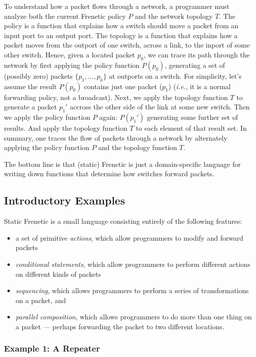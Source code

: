 \documentclass{article}
\newcommand{\ie}{\emph{i.e.}}
\begin{document}
To understand how a packet flows through a network, a programmer must
analyze both the current Frenetic policy $P$ and the network topology
$T$.  The policy is a function that explains how a switch should move
a packet from an input port to an output port.  The topology is a
function that explains how a packet moves from the outport of one
switch, across a link, to the inport of some other switch.  Hence,
given a located packet $p_0$, we can trace its path through the
network by first applying the policy function $P(p_0)$, generating a
set of (possibly zero) packets $\{p_1,\ldots,p_k\}$ at outports on a
switch.  For simplicity, let's assume the result $P(p_0)$ contains
just one packet ($p_1$) (\ie, it is a normal forwarding policy, not a
broadcast).  Next, we apply the topology function $T$ to generate a
packet $p_1'$ accross the other side of the link at some new switch.
Then we apply the policy function $P$ again: $P(p_1')$ generating some
further set of results.  And apply the topology function $T$ to each
element of that result set.  In summary, one traces the flow of
packets through a network by alternately applying the policy function
$P$ and the topology function $T$.

The bottom line is that (static) Frenetic is just a domain-specific
language for writing down functions that determine how switches
forward packets.

\subsection{Introductory Examples}

Static Frenetic is a small language consisting entirely of the following
features:

\begin{itemize}
\item a set of primitive \emph{actions}, which allow programmers to modify and 
forward packets
\item \emph{conditional statements}, which allow programmers to perform 
different actions on different kinds of packets
\item  \emph{sequencing}, which allows programmers to perform a series of
transformations on a packet, and
\item \emph{parallel composition}, which allows programmers to do more
than one thing on a packet --- perhaps forwarding the packet to two 
different locations.
\end{itemize}

\subsubsection{Example 1: A Repeater}
\end{document}

